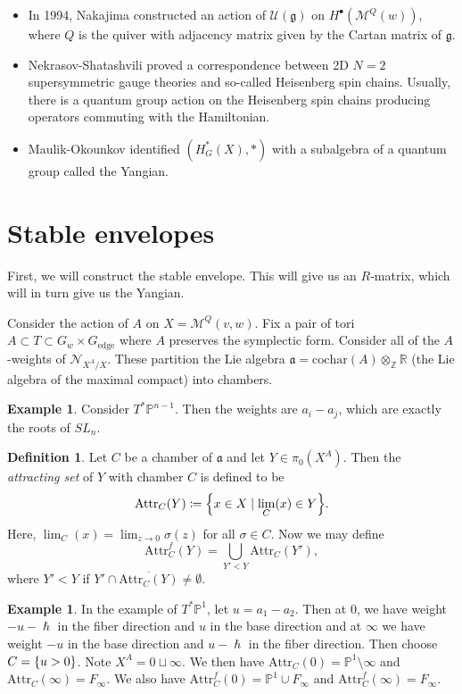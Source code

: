 \documentclass[leqno, openany]{memoir}
\theoremstyle{definition}
\newtheorem{defn}[thm]{Definition}
\newtheorem{exm}[thm]{Example}
\theoremstyle{remark}
\theoremstyle{plain}
\theoremstyle{definition}
\theoremstyle{remark}
\newcommand{\R}{\mathbb{R}}
\newcommand{\Z}{\mathbb{Z}}
\renewcommand{\P}{\mathbb{P}}
\newcommand{\mc}[1]{\mathcal{#1}}
\newcommand{\mf}[1]{\mathfrak{#1}}
\newcommand{\mr}[1]{\mathrm{#1}}
\newcommand{\ol}[1]{\overline{#1}}
\begin{document}
\begin{itemize}
    \item In 1994, Nakajima constructed an action of $\mc{U}(\mf{g})$ on $H^{\bullet}(\mc{M}^Q(w))$, where $Q$ is the quiver with adjacency matrix given by the Cartan matrix of $\mf{g}$.
    \item Nekrasov-Shatashvili proved a correspondence between 2D $N=2$ supersymmetric gauge theories and so-called Heisenberg spin chains. Usually, there is a quantum group action on the Heisenberg spin chains producing operators commuting with the Hamiltonian.
    \item Maulik-Okounkov identified $(H_G^*(X), *)$ with a subalgebra of a quantum group called the Yangian.
\end{itemize}

\section{Stable envelopes}

First, we will construct the stable envelope. This will give us an $R$-matrix, which will in turn give us the Yangian.

Consider the action of $A$ on $X = \mc{M}^Q(v, w)$. Fix a pair of tori $A \subset T \subset G_w \times G_{\mr{edge}}$ where $A$ preserves the symplectic form. Consider all of the $A$-weights of $\mc{N}_{X^A/X}$. These partition the Lie algebra $\mf{a} = \mr{cochar}(A) \otimes_{\Z} \R$ (the Lie algebra of the maximal compact) into chambers.

\begin{exm}
    Consider $T^* \P^{n-1}$. Then the weights are $a_i - a_j$, which are exactly the roots of $SL_n$.
\end{exm}

\begin{defn}
    Let $C$ be a chamber of $\mf{a}$ and let $Y \in \pi_0(X^A)$. Then the \textit{attracting set} of $Y$ with chamber $C$ is defined to be
    \[ \mr{Attr}_C(Y) \coloneqq \qty{x \in X \mid \lim_C(x) \in Y}. \]
    Here, $\lim_C(x) = \lim_{z \to 0} \sigma(z)$ for all $\sigma \in C$. Now we may define
    \[ \mr{Attr}_C^f(Y) = \bigcup_{Y' < Y} \mr{Attr}_C(Y'), \]
    where $Y' < Y$ if $Y' \cap \ol{\mr{Attr}_C(Y)} \neq \emptyset$.
\end{defn}

\begin{exm}
    In the example of $T^* \P^1$, let $u = a_1 - a_2$. Then at $0$, we have weight $-u-\hslash$ in the fiber direction and $u$ in the base direction and at $\infty$ we have weight $-u$ in the base direction and $u-\hslash$ in the fiber direction. Then choose $C = \qty{u > 0}$. Note $X^A = 0 \sqcup \infty$. We then have $\mr{Attr}_C(0) = \P^1 \setminus \infty$ and $\mr{Attr}_C(\infty) = F_{\infty}$. We also have $\mr{Attr}_C^f(0) = \P^1 \cup F_{\infty}$ and $\mr{Attr}_C^f(\infty) = F_{\infty}$.
\end{exm}
\end{document}
